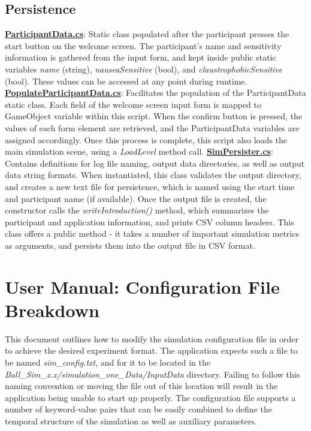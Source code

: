 \documentclass{article}
\begin{document}
\subsection{Persistence} 
\href{https://bit.ly/2Fhq8B2}{\textbf{ParticipantData.cs}}: Static class populated after the participant presses the start button on the welcome screen. The participant's name and sensitivity information is gathered from the input form, and kept inside public static variables \textit{name} (string), \textit{nauseaSensitive} (bool), and \textit{claustrophobicSensitive} (bool). These values can be accessed at any point during runtime. \newline \newline
\href{https://bit.ly/2WgL6qR}{\textbf{PopulateParticipantData.cs}}: Facilitates the population of the ParticipantData static class. Each field of the welcome screen input form is mapped to GameObject variable within this script. When the confirm button is pressed, the values of each form element are retrieved, and the ParticipantData variables are assigned accordingly. Once this process is complete, this script also loads the main simulation scene, using a \textit{LoadLevel} method call. \newline \newline
\href{https://bit.ly/2OdbwH6}{\textbf{SimPersister.cs}}: Contains definitions for log file naming, output data directories, as well as output data string formats. When instantiated, this class validates the output directory, and creates a new text file for persistence, which is named using the start time and participant name (if available). Once the output file is created, the constructor calls the \textit{writeIntroduction()} method, which summarizes the participant and application information, and prints CSV column headers. This class offers a public method  - it takes a number of important simulation metrics as arguments, and persists them into the output file in CSV format.


\pagebreak\section{User Manual: Configuration File Breakdown}
This document outlines how to modify the simulation configuration file in order to achieve the desired experiment format. The application expects such a file to be named \textit{sim\_config.txt}, and for it to be located in the \textit{Ball\_Sim\_x.x\slash simulation\_one\_Data\slash InputData} directory. Failing to follow this naming convention or moving the file out of this location will result in the application being unable to start up properly. The configuration file supports a number of keyword-value pairs that can be easily combined to define the temporal structure of the simulation as well as auxiliary parameters. 
\end{document}
